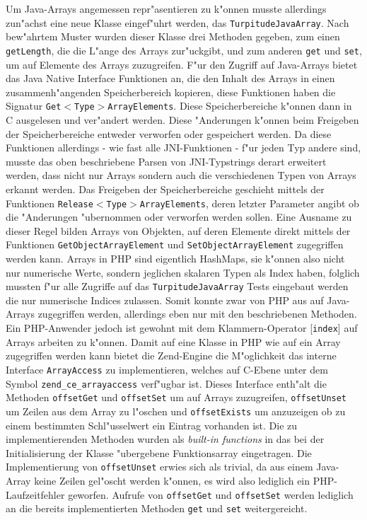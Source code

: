 Um Java-Arrays angemessen repr"asentieren zu k"onnen musste 
allerdings zun"achst eine neue Klasse eingef"uhrt werden, das \texttt{TurpitudeJavaArray}. Nach bew"ahrtem Muster wurden dieser Klasse drei Methoden
gegeben, zum einen \texttt{getLength}, die die L"ange des Arrays zur"uckgibt, und zum anderen \texttt{get} und \texttt{set}, um auf Elemente des Arrays zuzugreifen.
F"ur den Zugriff auf Java-Arrays bietet das Java Native Interface Funktionen an, die den Inhalt des Arrays in einen zusammenh"angenden Speicherbereich kopieren,
diese Funktionen haben die Signatur \texttt{Get$<$Type$>$ArrayElements}. Diese Speicherbereiche k"onnen  dann in C ausgelesen und ver"andert werden. 
Diese "Anderungen k"onnen beim Freigeben der Speicherbereiche entweder verworfen oder gespeichert werden. Da diese
Funktionen allerdings - wie fast alle JNI-Funktionen - f"ur jeden Typ andere sind, musste das oben beschriebene Parsen von JNI-Typstrings derart erweitert werden,
dass nicht nur Arrays sondern auch die verschiedenen Typen von Arrays erkannt werden. Das Freigeben der Speicherbereiche geschieht mittels der
Funktionen \texttt{Release$<$Type$>$ArrayElements}, deren letzter Parameter angibt ob die "Anderungen "ubernommen oder verworfen werden sollen.
Eine Ausname zu dieser Regel bilden Arrays von Objekten, auf deren Elemente direkt mittels der Funktionen \texttt{GetObjectArrayElement} und
\texttt{SetObjectArrayElement} zugegriffen werden kann.
Arrays in PHP sind eigentlich HashMaps, sie k"onnen also nicht nur numerische Werte, sondern jeglichen skalaren Typen als Index haben, folglich mussten
f"ur alle Zugriffe auf das \texttt{TurpitudeJavaArray} Tests eingebaut werden die nur numerische Indices zulassen.
Somit konnte zwar von PHP aus auf Java-Arrays zugegriffen werden,
allerdings eben nur mit den beschriebenen Methoden. Ein PHP-Anwender jedoch ist gewohnt mit dem Klammern-Operator [\texttt{index}] auf Arrays arbeiten zu k"onnen.
Damit auf eine Klasse in PHP wie auf ein Array zugegriffen werden kann bietet die Zend-Engine die M"oglichkeit das interne Interface \texttt{ArrayAccess} zu
implementieren, welches auf C-Ebene unter dem Symbol \texttt{zend\_ce\_arrayaccess} verf"ugbar ist. Dieses Interface enth"alt die Methoden \texttt{offsetGet} und
\texttt{offsetSet} um auf Arrays zuzugreifen, \texttt{offsetUnset} um Zeilen aus dem Array zu l"oschen und \texttt{offsetExists} um anzuzeigen ob zu einem
bestimmten Schl"usselwert ein Eintrag vorhanden ist. Die zu implementierenden Methoden wurden als \emph{built-in functions} in das bei der Initialisierung der
Klasse "ubergebene Funktionsarray eingetragen. Die Implementierung von \texttt{offsetUnset} erwies sich als trivial, da aus einem Java-Array keine
Zeilen gel"oscht werden k"onnen, es wird also lediglich ein PHP-Laufzeitfehler geworfen. Aufrufe von \texttt{offsetGet} und \texttt{offsetSet} werden lediglich
an die bereits implementierten Methoden \texttt{get} und \texttt{set} weitergereicht. 

